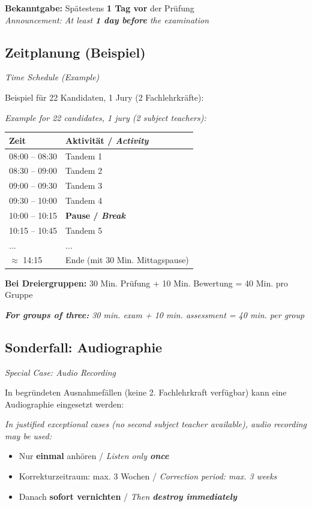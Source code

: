 \documentclass[11pt,a4paper]{article}
\newcommand{\bipar}[2]{%
    #1\par\vspace{2pt}%
    {\small\color{englishgray}\textit{#2}}\par\vspace{8pt}%
}
\newcommand{\bisubsection}[2]{%
    \subsection{#1}%
    {\small\color{englishgray}\textit{#2}}\par\vspace{4pt}%
}
\begin{document}
\begin{warnbox}
\textbf{Bekanntgabe:} Spätestens \textbf{1 Tag vor} der Prüfung\\
{\color{englishgray}\textit{Announcement: At least \textbf{1 day before} the examination}}
\end{warnbox}

\bisubsection{Zeitplanung (Beispiel)}{Time Schedule (Example)}

\bipar{Beispiel für 22 Kandidaten, 1 Jury (2 Fachlehrkräfte):}{Example for 22 candidates, 1 jury (2 subject teachers):}

\begin{center}
\begin{tabular}{|l|l|}
\hline
\rowcolor{spanischrot}\color{white}\textbf{Zeit} & \color{white}\textbf{Aktivität / \textit{Activity}} \\
\hline
08:00 -- 08:30 & Tandem 1 \\
08:30 -- 09:00 & Tandem 2 \\
09:00 -- 09:30 & Tandem 3 \\
09:30 -- 10:00 & Tandem 4 \\
\hline
10:00 -- 10:15 & \textbf{Pause / \textit{Break}} \\
\hline
10:15 -- 10:45 & Tandem 5 \\
... & ... \\
\hline
$\approx$ 14:15 & Ende (mit 30 Min. Mittagspause) \\
\hline
\end{tabular}
\end{center}

\bipar{\textbf{Bei Dreiergruppen:} 30 Min. Prüfung + 10 Min. Bewertung = 40 Min. pro Gruppe}{\textbf{For groups of three:} 30 min. exam + 10 min. assessment = 40 min. per group}

\bisubsection{Sonderfall: Audiographie}{Special Case: Audio Recording}

\bipar{In begründeten Ausnahmefällen (keine 2. Fachlehrkraft verfügbar) kann eine Audiographie eingesetzt werden:}{In justified exceptional cases (no second subject teacher available), audio recording may be used:}

\begin{itemize}
\item Nur \textbf{einmal} anhören / {\color{englishgray}\textit{Listen only \textbf{once}}}
\item Korrekturzeitraum: max. 3 Wochen / {\color{englishgray}\textit{Correction period: max. 3 weeks}}
\item Danach \textbf{sofort vernichten} / {\color{englishgray}\textit{Then \textbf{destroy immediately}}}
\end{itemize}
\end{document}
